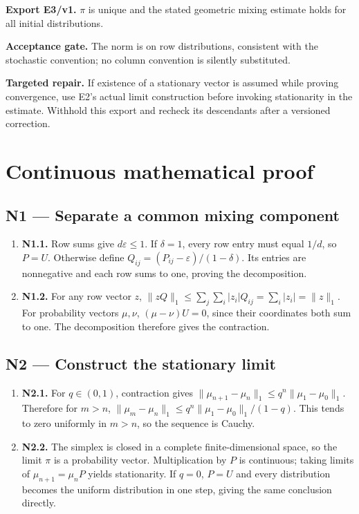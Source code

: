\documentclass[preprint,12pt,aps,pra,showkeys,amsmath,amssymb,superscriptaddress,floatfix]{revtex4-2}
\theoremstyle{definition}
\theoremstyle{remark}
\newcommand{\field}[2]{\par\smallskip\noindent\textbf{#1.} #2\par}
\begin{document}
\field{Export E3/v1}{\(\pi\) is unique and the stated geometric mixing estimate holds for all
initial distributions.}

\field{Acceptance gate}{The norm is on row distributions, consistent with the stochastic
convention; no column convention is silently substituted.}

\field{Targeted repair}{If existence of a stationary vector is assumed while proving
convergence, use E2's actual limit construction before invoking
stationarity in the estimate. Withhold this export and recheck its
descendants after a versioned correction.}

\endgroup\clearpage\section{Continuous mathematical proof}\label{sec:proof}

\subsection{N1 --- Separate a common mixing
component}\label{n1-separate-a-common-mixing-component}

\begin{enumerate}
\def\labelenumi{\arabic{enumi}.}
\item
  \textbf{N1.1.} Row sums give \(d\varepsilon\le1\). If \(\delta=1\),
  every row entry must equal \(1/d\), so \(P=U\). Otherwise define
  \(Q_{ij}=(P_{ij}-\varepsilon)/(1-\delta)\). Its entries are
  nonnegative and each row sums to one, proving the decomposition.
\item
  \textbf{N1.2.} For any row vector \(z\),
  \(\|zQ\|_1\le\sum_j\sum_i|z_i|Q_{ij}=\sum_i|z_i|=\|z\|_1\). For
  probability vectors \(\mu,\nu\), \((\mu-\nu)U=0\), since their
  coordinates both sum to one. The decomposition therefore gives the
  contraction.
\end{enumerate}

\subsection{N2 --- Construct the stationary
limit}\label{n2-construct-the-stationary-limit}

\begin{enumerate}
\def\labelenumi{\arabic{enumi}.}
\item
  \textbf{N2.1.} For \(q\in(0,1)\), contraction gives
  \(\|\mu_{n+1}-\mu_n\|_1\le q^n\|\mu_1-\mu_0\|_1\). Therefore for
  \(m>n\), \(\|\mu_m-\mu_n\|_1\le q^n\|\mu_1-\mu_0\|_1/(1-q)\). This
  tends to zero uniformly in \(m>n\), so the sequence is Cauchy.
\item
  \textbf{N2.2.} The simplex is closed in a complete finite-dimensional
  space, so the limit \(\pi\) is a probability vector. Multiplication by
  \(P\) is continuous; taking limits of \(\mu_{n+1}=\mu_nP\) yields
  stationarity. If \(q=0\), \(P=U\) and every distribution becomes the
  uniform distribution in one step, giving the same conclusion directly.
\end{enumerate}
\end{document}
